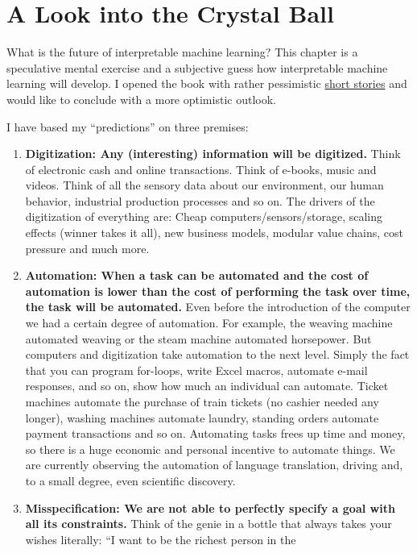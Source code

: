 \documentclass[12pt,]{krantz}
\providecommand{\tightlist}{%
  \setlength{\itemsep}{0pt}\setlength{\parskip}{0pt}}
\begin{document}
\hypertarget{future}{\chapter{A Look into the Crystal
Ball}\label{future}}

What is the future of interpretable machine learning? This chapter is a
speculative mental exercise and a subjective guess how interpretable
machine learning will develop. I opened the book with rather pessimistic
\protect\hyperlink{storytime}{short stories} and would like to conclude
with a more optimistic outlook.

I have based my ``predictions'' on three premises:

\begin{enumerate}
\def\labelenumi{\arabic{enumi}.}
\tightlist
\item
  \textbf{Digitization: Any (interesting) information will be
  digitized.} Think of electronic cash and online transactions. Think of
  e-books, music and videos. Think of all the sensory data about our
  environment, our human behavior, industrial production processes and
  so on. The drivers of the digitization of everything are: Cheap
  computers/sensors/storage, scaling effects (winner takes it all), new
  business models, modular value chains, cost pressure and much more.
\item
  \textbf{Automation: When a task can be automated and the cost of
  automation is lower than the cost of performing the task over time,
  the task will be automated.} Even before the introduction of the
  computer we had a certain degree of automation. For example, the
  weaving machine automated weaving or the steam machine automated
  horsepower. But computers and digitization take automation to the next
  level. Simply the fact that you can program for-loops, write Excel
  macros, automate e-mail responses, and so on, show how much an
  individual can automate. Ticket machines automate the purchase of
  train tickets (no cashier needed any longer), washing machines
  automate laundry, standing orders automate payment transactions and so
  on. Automating tasks frees up time and money, so there is a huge
  economic and personal incentive to automate things. We are currently
  observing the automation of language translation, driving and, to a
  small degree, even scientific discovery.
\item
  \textbf{Misspecification: We are not able to perfectly specify a goal
  with all its constraints.} Think of the genie in a bottle that always
  takes your wishes literally: ``I want to be the richest person in the

\end{enumerate}
\end{document}
